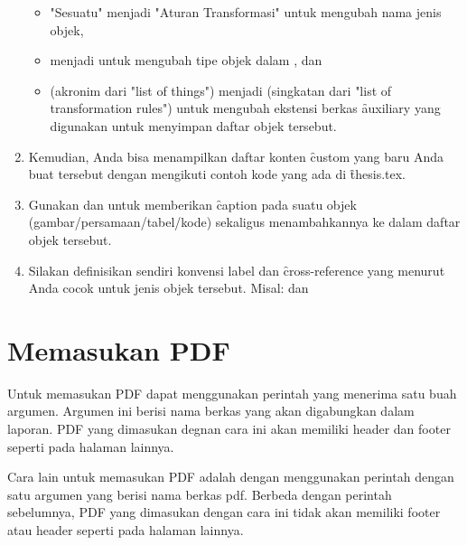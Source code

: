 \begin{enumerate}
	\begin{itemize}
		\item "Sesuatu" menjadi "Aturan Transformasi" untuk mengubah nama jenis objek,
		\item {} menjadi  untuk mengubah tipe objek dalam \latex, dan
		\item {} (akronim dari "list of things") menjadi  (singkatan dari "list of transformation rules") untuk mengubah ekstensi berkas \f{auxiliary} yang digunakan untuk menyimpan daftar objek tersebut.
	\end{itemize}
	\item Kemudian, Anda bisa menampilkan daftar konten \f{custom} yang baru Anda buat tersebut dengan mengikuti contoh kode yang ada di \f{thesis.tex}.
	\item Gunakan  dan  untuk memberikan \f{caption} pada suatu objek (gambar/persamaan/tabel/kode) sekaligus menambahkannya ke dalam daftar objek tersebut.
	\item Silakan definisikan sendiri konvensi label dan \f{cross-reference} yang menurut Anda cocok untuk jenis objek tersebut. Misal:  dan 
\end{enumerate}


\section{Memasukan PDF}
\label{sec:pdf}
Untuk memasukan PDF dapat menggunakan perintah  yang menerima satu buah argumen.
Argumen ini berisi nama berkas yang akan digabungkan dalam laporan.
PDF yang dimasukan degnan cara ini akan memiliki header dan footer seperti pada halaman lainnya.


Cara lain untuk memasukan PDF adalah dengan menggunakan perintah  dengan satu argumen yang berisi nama berkas pdf.
Berbeda dengan perintah sebelumnya, PDF yang dimasukan dengan cara ini tidak akan memiliki footer atau header seperti pada halaman lainnya.



